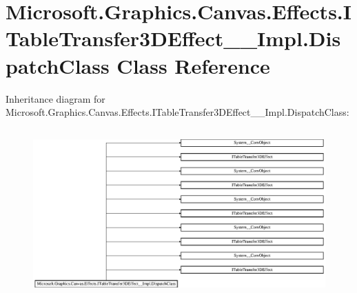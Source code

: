 \hypertarget{class_microsoft_1_1_graphics_1_1_canvas_1_1_effects_1_1_i_table_transfer3_d_effect_____impl_1_1_dispatch_class}{}\section{Microsoft.\+Graphics.\+Canvas.\+Effects.\+I\+Table\+Transfer3\+D\+Effect\+\_\+\+\_\+\+Impl.\+Dispatch\+Class Class Reference}
\label{class_microsoft_1_1_graphics_1_1_canvas_1_1_effects_1_1_i_table_transfer3_d_effect_____impl_1_1_dispatch_class}
Inheritance diagram for Microsoft.\+Graphics.\+Canvas.\+Effects.\+I\+Table\+Transfer3\+D\+Effect\+\_\+\+\_\+\+Impl.\+Dispatch\+Class\+:\begin{figure}[H]
\begin{center}
\leavevmode
\includegraphics[height=6.511628cm]{class_microsoft_1_1_graphics_1_1_canvas_1_1_effects_1_1_i_table_transfer3_d_effect_____impl_1_1_dispatch_class}
\end{center}
\end{figure}

